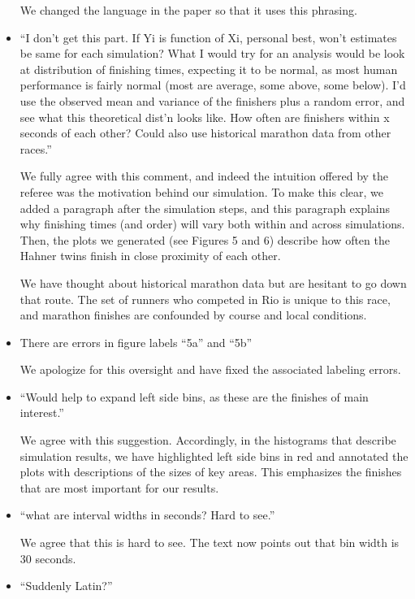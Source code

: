 \documentclass[12pt]{article}
\begin{document}
\begin{itemize}
  We changed the language in the paper so that it uses this phrasing.
  
\item ``I don't get this part. If Yi is function of Xi, personal best,
  won't estimates be same for each simulation?  What I would try for
  an analysis would be look at distribution of finishing times,
  expecting it to be normal, as most human performance is fairly
  normal (most are average, some above, some below). I'd use the
  observed mean and variance of the finishers plus a random error, and
  see what this theoretical dist'n looks like. How often are finishers
  within x seconds of each other? Could also use historical marathon
  data from other races.''

  We fully agree with this comment, and indeed the intuition offered
  by the referee was the motivation behind our simulation.  To make
  this clear, we added a paragraph after the simulation steps, and
  this paragraph explains why finishing times (and order) will vary
  both within and across simulations.  Then, the plots we generated
  (see Figures 5 and 6) describe how often the Hahner twins finish
  in close proximity of each other.

  We have thought about historical marathon data but are hesitant to
  go down that route.  The set of runners who competed in Rio is
  unique to this race, and marathon finishes are confounded by course
  and local conditions.
  
\item There are errors in figure labels ``5a'' and ``5b''
  
  We apologize for this oversight and have fixed the associated
  labeling errors.

\item ``Would help to expand left side bins, as these are the finishes
  of main interest.''
  
  We agree with this suggestion.  Accordingly, in the histograms that
  describe simulation results, we have highlighted left side bins in
  red and annotated the plots with descriptions of the sizes of key
  areas.  This emphasizes the finishes that are most important for our
  results.

\item ``what are interval widths in seconds? Hard to see.''

  We agree that this is hard to see.  The text now points out that bin
  width is 30 seconds.

\item ``Suddenly Latin?''
  

\end{itemize}
\end{document}
